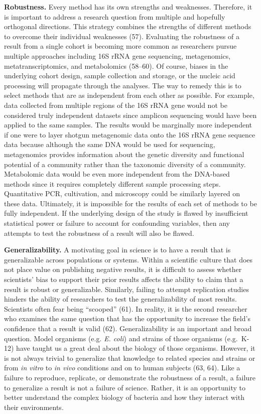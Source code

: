 \documentclass[]{article}
\begin{document}
\textbf{Robustness.} Every method has its own strengths and weaknesses.
Therefore, it is important to address a research question from multiple
and hopefully orthogonal directions. This strategy combines the
strengths of different methods to overcome their individual weaknesses
(57). Evaluating the robustness of a result from a single cohort is
becoming more common as researchers pursue multiple approaches including
16S rRNA gene sequencing, metagenomics, metatranscriptomics, and
metabolomics (58--60). Of course, biases in the underlying cohort
design, sample collection and storage, or the nucleic acid processing
will propagate through the analyses. The way to remedy this is to select
methods that are as independent from each other as possible. For
example, data collected from multiple regions of the 16S rRNA gene would
not be considered truly independent datasets since amplicon sequencing
would have been applied to the same samples. The results would be
marginally more independent if one were to layer shotgun metagenomic
data onto the 16S rRNA gene sequence data because although the same DNA
would be used for sequencing, metagenomics provides information about
the genetic diversity and functional potential of a community rather
than the taxonomic diversity of a community. Metabolomic data would be
even more independent from the DNA-based methods since it requires
completely different sample processing steps. Quantitative PCR,
cultivation, and microscopy could be similarly layered on these data.
Ultimately, it is impossible for the results of each set of methods to
be fully independent. If the underlying design of the study is flawed by
insufficient statistical power or failure to account for confounding
variables, then any attempts to test the robustness of a result will
also be flawed.

\textbf{Generalizability.} A motivating goal in science is to have a
result that is generalizable across populations or systems. Within a
scientific culture that does not place value on publishing negative
results, it is difficult to assess whether scientists' bias to support
their prior results affects the ability to claim that a result is robust
or generalizable. Similarly, failing to attempt replication studies
hinders the ability of researchers to test the generalizability of most
results. Scientists often fear being ``scooped'' (61). In reality, it is
the second researcher who examines the same question that has the
opportunity to increase the field's confidence that a result is valid
(62). Generalizability is an important and broad question. Model
organisms (e.g. \emph{E. coli}) and strains of those organisms
(e.g.~K-12) have taught us a great deal about the biology of those
organisms. However, it is not always trivial to generalize that
knowledge to related species and strains or from \emph{in vitro} to
\emph{in vivo} conditions and on to human subjects (63, 64). Like a
failure to reproduce, replicate, or demonstrate the robustness of a
result, a failure to generalize a result is not a failure of science.
Rather, it is an opportunity to better understand the complex biology of
bacteria and how they interact with their environments.
\end{document}
